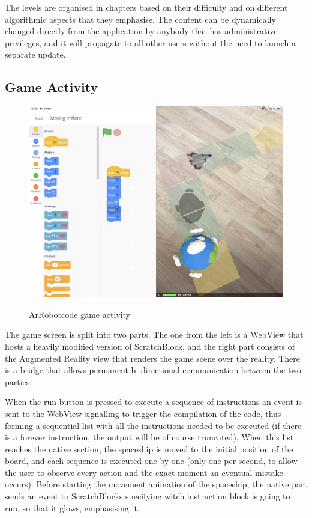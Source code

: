 \documentclass[12 pct]{report}
\begin{document}
The levels are organised in chapters based on their difficulty and on different algorithmic aspects that they emphasise. The content can be dynamically changed directly from the application by anybody that has administrative privileges, and it will propagate to all other users without the need to launch a separate update.


\subsection*{Game Activity}
\begin{figure}[H]
\includegraphics[width=1.0\textwidth]{ArRobotCode2}
\centering
\label{fig:hololens}
\caption{ArRobotcode game activity}
\end{figure}
The game screen is split into two parts. The one from the left is a WebView that hosts a heavily modified version of ScratchBlock, and the right part consists of the Augmented Reality view that renders the game scene over the reality. There is a bridge that allows permanent bi-directional communication between the two parties.

When the run button is pressed to execute a sequence of instructions an event is sent to the WebView signalling to trigger the compilation of the code, thus forming a sequential list with all the instructions needed to be executed (if there is a forever instruction, the output will be of course truncated). When this list reaches the native section, the spaceship is moved to the initial position of the board, and each sequence is executed one by one (only one per second, to allow the user to observe every action and the exact moment an eventual mistake occurs). Before starting the movement animation of the spaceship, the native part sends an event to ScratchBlocks specifying witch instruction block is going to run, so that it glows, emphasising it.
\end{document}
